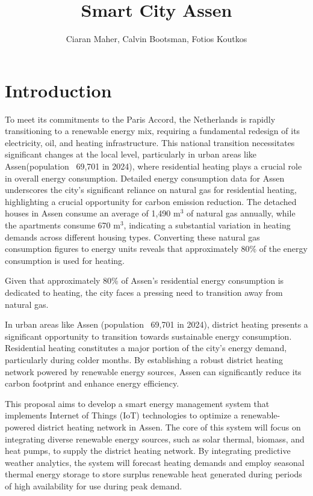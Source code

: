 \documentclass{article}
\title{Smart City Assen}
\author{Ciaran Maher, Calvin Bootsman, Fotios Koutkos}
\begin{document}
\maketitle
\section{Introduction}
To meet its commitments to the Paris Accord, the Netherlands is rapidly transitioning to a renewable energy mix, requiring a fundamental redesign of its electricity, oil, and heating infrastructure\cite{paris_agreement}. This national transition necessitates significant changes at the local level, particularly in urban areas like Assen(population ~69,701 in 2024\cite{allecijfers}), where residential heating plays a crucial role in overall energy consumption. Detailed energy consumption data for Assen underscores the city's significant reliance on natural gas for residential heating, highlighting a crucial opportunity for carbon emission reduction. The detached houses in Assen consume an average of 1,490 m$^3$ of natural gas annually, while the apartments consume 670 m$^3$\cite{assen_woningen}, indicating a substantial variation in heating demands across different housing types. Converting these natural gas consumption figures to energy units reveals that approximately 80\% of the energy consumption is used for heating.

Given that approximately 80\% of Assen's residential energy consumption is dedicated to heating, the city faces a pressing need to transition away from natural gas. 

In urban areas like Assen (population ~69,701 in 2024\cite{allecijfers}), district heating presents a significant opportunity to transition towards sustainable energy consumption. Residential heating constitutes a major portion of the city's energy demand, particularly during colder months. By establishing a robust district heating network powered by renewable energy sources, Assen can significantly reduce its carbon footprint and enhance energy efficiency\cite{allecijfers}.

This proposal aims to develop a smart energy management system that implements Internet of Things (IoT) technologies to optimize a renewable-powered district heating network in Assen. The core of this system will focus on integrating diverse renewable energy sources, such as solar thermal, biomass, and heat pumps, to supply the district heating network. By integrating predictive weather analytics, the system will forecast heating demands and employ seasonal thermal energy storage to store surplus renewable heat generated during periods of high availability for use during peak demand.
\end{document}
